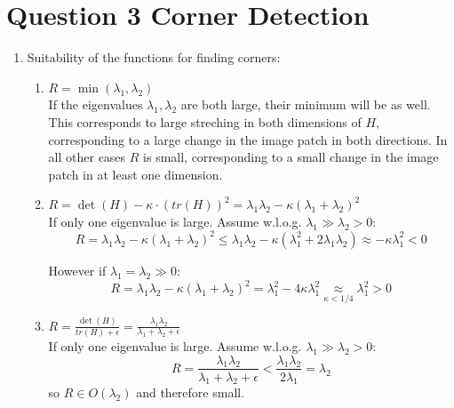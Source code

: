\documentclass[12pt,letterpaper]{article}
\begin{document}
\section*{Question 3 Corner Detection}
\begin{enumerate}[label=(\alph*)]
    \item Suitability of the functions for finding corners:
    \begin{enumerate}
        \item \( R = \min(\lambda_1, \lambda_2) \) \\
        If the eigenvalues \( \lambda_1, \lambda_2 \) are both large, their minimum will be as well.
        This corresponds to large streching in both dimensions of \( H \), 
        corresponding to a large change in the image patch in both directions.
        In all other cases \( R \) is small, 
        corresponding to a small change in the image patch in at least one dimension.
        \item \( R = \det(H) - \kappa \cdot (tr(H))^2 = \lambda_1  \lambda_2 - \kappa(\lambda_1 + \lambda_2)^2    \)  \\
        If only one eigenvalue is large. Assume w.l.o.g. \( \lambda_1 \gg \lambda_2 > 0 \):
        \begin{equation}
            R = 
            \lambda_1  \lambda_2 - \kappa(\lambda_1 + \lambda_2)^2
            \leq
            \lambda_1 \lambda_2 - \kappa(\lambda_1^2 + 2 \lambda_1\lambda_2)
            \approx
            -\kappa\lambda_1^2 < 0
        \end{equation}

        However if \( \lambda_1 = \lambda_2 \gg 0 \):
        \begin{equation}
            R = 
            \lambda_1  \lambda_2 - \kappa(\lambda_1 + \lambda_2)^2
            =
            \lambda_1^2 - 4\kappa\lambda_1^2
            \underset{\kappa < 1/4}{\approx}
            \lambda_1^2 
            > 0
        \end{equation}
        \item \( R = \frac{\det(H)}{tr(H) + \epsilon} 
                    = \frac{\lambda_1 \lambda_2}{\lambda_1 + \lambda_2 + \epsilon} \) \\
        If only one eigenvalue is large. Assume w.l.o.g. \( \lambda_1 \gg \lambda_2 > 0 \):
        \begin{equation}
            R 
            = \frac{\lambda_1 \lambda_2}{\lambda_1 + \lambda_2 + \epsilon}
            < \frac{\lambda_1 \lambda_2}{2\lambda_1}
            = \lambda_2
        \end{equation}
        so \( R \in O(\lambda_2) \) and therefore small.
        

\end{enumerate}
\end{enumerate}
\end{document}
